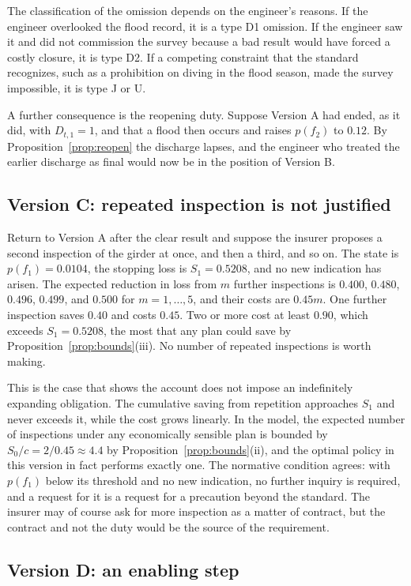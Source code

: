 \documentclass[11pt]{article}
\theoremstyle{plain}
\theoremstyle{definition}
\begin{document}
The classification of the omission depends on the engineer's reasons. If the engineer overlooked the flood record, it is a type D1 omission. If the engineer saw it and did not commission the survey because a bad result would have forced a costly closure, it is type D2. If a competing constraint that the standard recognizes, such as a prohibition on diving in the flood season, made the survey impossible, it is type J or U.

A further consequence is the reopening duty. Suppose Version A had ended, as it did, with $D_{t,1}=1$, and that a flood then occurs and raises $p(f_2)$ to $0.12$. By Proposition~\ref{prop:reopen} the discharge lapses, and the engineer who treated the earlier discharge as final would now be in the position of Version B.

\subsection*{Version C: repeated inspection is not justified}

Return to Version A after the clear result and suppose the insurer proposes a second inspection of the girder at once, and then a third, and so on. The state is $p(f_1)=0.0104$, the stopping loss is $S_1=0.5208$, and no new indication has arisen. The expected reduction in loss from $m$ further inspections is $0.400$, $0.480$, $0.496$, $0.499$, and $0.500$ for $m=1,\dots,5$, and their costs are $0.45m$. One further inspection saves $0.40$ and costs $0.45$. Two or more cost at least $0.90$, which exceeds $S_1=0.5208$, the most that any plan could save by Proposition~\ref{prop:bounds}(iii). No number of repeated inspections is worth making.

This is the case that shows the account does not impose an indefinitely expanding obligation. The cumulative saving from repetition approaches $S_1$ and never exceeds it, while the cost grows linearly. In the model, the expected number of inspections under any economically sensible plan is bounded by $S_0/c=2/0.45\approx4.4$ by Proposition~\ref{prop:bounds}(ii), and the optimal policy in this version in fact performs exactly one. The normative condition agrees: with $p(f_1)$ below its threshold and no new indication, no further inquiry is required, and a request for it is a request for a precaution beyond the standard. The insurer may of course ask for more inspection as a matter of contract, but the contract and not the duty would be the source of the requirement.

\subsection*{Version D: an enabling step}
\end{document}
